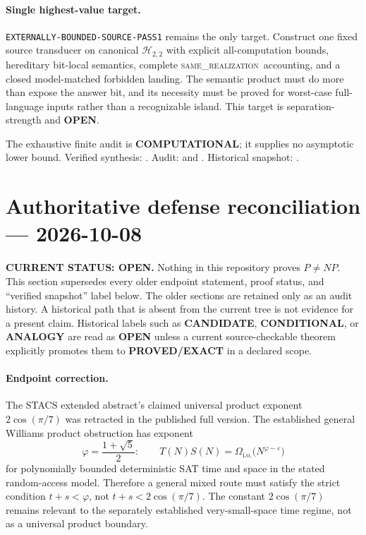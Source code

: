 \documentclass[11pt]{article}
\newcommand{\statusopen}{\textcolor{openstatus}{\textbf{OPEN}}}
\newcommand{\same}{\textnormal{\textsc{same\_realization}}}
\begin{document}
\paragraph{Single highest-value target.}
\texttt{EXTERNALLY-BOUNDED-SOURCE-PASS1} remains the only target. Construct
one fixed source transducer on canonical $\mathcal H_{2,2}$ with explicit
all-computation bounds, hereditary bit-local semantics, complete
\same\ accounting, and a closed model-matched forbidden landing. The semantic
product must do more than expose the answer bit, and its necessity must be
proved for worst-case full-language inputs rather than a recognizable island.
This target is separation-strength and \statusopen.

The exhaustive finite audit is \textbf{COMPUTATIONAL}; it supplies no
asymptotic lower bound. Verified synthesis:
.
Audit:
 and
.
Historical snapshot:
.

\clearpage


\section{Authoritative defense reconciliation --- 2026-10-08}

\begin{warningbox}
\textbf{CURRENT STATUS: OPEN.}  Nothing in this repository proves
$P\ne NP$.  This section supersedes every older endpoint statement, proof
status, and ``verified snapshot'' label below.  The older sections are retained
only as an audit history.  A historical path that is absent from the current
tree is not evidence for a present claim.  Historical labels such as
\textbf{CANDIDATE}, \textbf{CONDITIONAL}, or \textbf{ANALOGY} are read as
\textbf{OPEN} unless a current source-checkable theorem explicitly promotes
them to \textbf{PROVED/EXACT} in a declared scope.
\end{warningbox}

\paragraph{Endpoint correction.}
The STACS extended abstract's claimed universal product exponent
$2\cos(\pi/7)$ was retracted in the published full version.  The established
general Williams product obstruction has exponent
\[
 \varphi=\frac{1+\sqrt5}{2}:
 \qquad T(N)S(N)=\Omega_{\mathrm{i.o.}}
       \bigl(N^{\varphi-\varepsilon}\bigr)
\]
for polynomially bounded deterministic SAT time and space in the stated
random-access model.  Therefore a general mixed route must satisfy the strict
condition $t+s<\varphi$, not $t+s<2\cos(\pi/7)$.  The constant
$2\cos(\pi/7)$ remains relevant to the separately established very-small-space
time regime, not as a universal product boundary.
\end{document}
